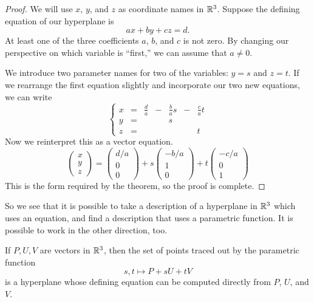 \documentclass[elementsmain.tex]{subfiles}
\begin{document}
\begin{proof} We will use $x$, $y$, and $z$ as coordinate names in $\mathbb{R}^3$.
Suppose the defining equation of our hyperplane is
\[
ax + by + cz = d.
\]
At least one of the three coefficients $a$, $b$, and $c$ is not zero. By changing our perspective on which variable is ``first,'' we can assume that $a\neq0$.

We introduce two parameter names for two of the variables: $y=s$ and $z=t$. If we rearrange the first equation slightly and incorporate our two new equations, we can write
\[
\left\{
\begin{array}{rrrrrrr}
x & = & \frac{d}{a} &- &\frac{b}{a} s &-& \frac{c}{a} t \\
y & = & & & s & & \\ 
z & = & & & & & t 
\end{array}\right.
\]
Now we reinterpret this as a vector equation.
\[
\begin{pmatrix} x \\ y \\ z \end{pmatrix} = \begin{pmatrix} d/a\\ 0 \\ 0 \end{pmatrix} 
+ s \begin{pmatrix} -b/a \\ 1 \\ 0 \end{pmatrix} + t \begin{pmatrix} -c/a \\ 0 \\ 1 \end{pmatrix}
\]
This is the form required by the theorem, so the proof is complete.
\end{proof}

So we see that it is possible to take a description of a hyperplane in $\mathbb{R}^3$ which uses an equation, and find a description that uses a parametric function. It is possible to work in the other direction, too.

\begin{theorem} If $P, U, V$ are vectors in $\mathbb{R}^3$, then the set of points traced out by the parametric function
\[
s,t\mapsto P +s U + t V
\]
is a hyperplane whose defining equation can be computed directly from $P$, $U$, and $V$.
\end{theorem}
\end{document}
